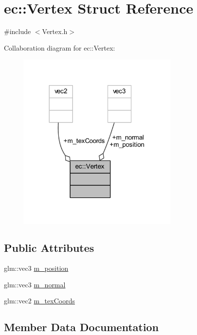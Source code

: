 \hypertarget{structec_1_1_vertex}{}\section{ec\+:\+:Vertex Struct Reference}
\label{structec_1_1_vertex}


{\ttfamily \#include $<$Vertex.\+h$>$}



Collaboration diagram for ec\+:\+:Vertex\+:\nopagebreak
\begin{figure}[H]
\begin{center}
\leavevmode
\includegraphics[width=227pt]{structec_1_1_vertex__coll__graph}
\end{center}
\end{figure}
\subsection*{Public Attributes}
\begin{DoxyCompactItemize}
\item 
glm\+::vec3 \mbox{\hyperlink{structec_1_1_vertex_acb3327c996406e4d1a6b43cfa1f3ea47}{m\+\_\+position}}
\item 
glm\+::vec3 \mbox{\hyperlink{structec_1_1_vertex_aec5eb9b7fc72c250525c6b64bfabd2a2}{m\+\_\+normal}}
\item 
glm\+::vec2 \mbox{\hyperlink{structec_1_1_vertex_a12e2b45d0fdb3873a01dd9ada9e66f64}{m\+\_\+tex\+Coords}}
\end{DoxyCompactItemize}


\subsection{Member Data Documentation}
\mbox{\label{structec_1_1_vertex_aec5eb9b7fc72c250525c6b64bfabd2a2}} 
